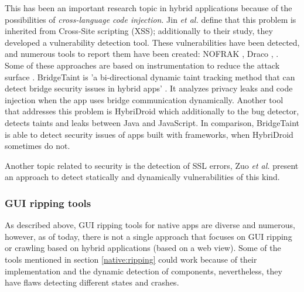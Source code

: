 This has been an important research topic in hybrid applications because of the possibilities of \textit{cross-language code injection}. Jin \textit{et al.} \cite{Jin:2014:CIA:2660267.2660275} define that this problem is inherited from Cross-Site scripting (XSS); additionally to their study, they developed a vulnerability detection tool.  These vulnerabilities have been detected, and numerous tools to report them have been created: NOFRAK \cite{georgiev_jana_shmatikov_2014}, Draco \cite{Tuncay:2016:DSU:2976749.2978322}, \cite{10.1007/978-3-319-27659-5_22}. Some of these approaches are based on instrumentation to  reduce the attack surface \cite{Shehab:2014:RAS:2688412.2688417}. BridgeTaint\cite{8410576} is 'a bi-directional dynamic taint tracking method that
can detect bridge security issues in hybrid apps' \cite{8410576}. It analyzes privacy leaks and code injection when the app uses bridge communication dynamically. Another tool that addresses this problem is HybriDroid\cite{7582763} which additionally to the bug detector, detects taints and leaks between Java and JavaScript. In comparison, BridgeTaint is able to detect security issues of apps built with frameworks, when HybriDroid sometimes do not.

Another topic related to security is the detection of SSL errors, Zuo  \textit{et al.} \cite{Zuo:2015:ADS:2714576.2714583} present an approach to detect statically and dynamically vulnerabilities of this kind.

\subsubsection{GUI ripping tools}

As described above, GUI ripping tools for native apps are diverse and numerous, however, as of today, there is not a single approach that focuses on GUI ripping or crawling based on hybrid applications (based on a web view). Some of the tools mentioned in section \ref{native:ripping} could work because of their implementation and the dynamic detection of components, nevertheless, they have flaws detecting different states and crashes.



